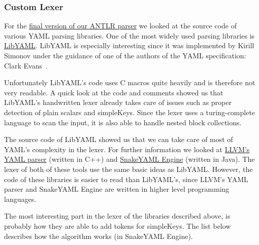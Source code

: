 \subsubsection{Custom Lexer}

For the \href{https://www.libelektra.org/plugins/yanlr}{final version of our ANTLR parser} we looked at the source code of various YAML parsing libraries. One of the most widely used parsing libraries is \href{https://github.com/yaml/libyaml}{LibYAML}. LibYAML is especially interesting since it was implemented by Kirill Simonov under the guidance of one of the authors of the YAML specification: Clark Evans~\cite{libyaml2018pyyaml}.

Unfortunately LibYAML’s code uses C macros quite heavily and is therefore not very readable. A quick look at the code and comments showed us that LibYAML’s handwritten lexer already takes care of issues such as proper detection of plain scalars and \glspl{simpleKey}. Since the lexer uses a turing-complete language to scan the input, it is also able to handle nested block \glspl{collection}.

The source code of LibYAML showed us that we can take care of most of YAML’s  complexity in the lexer. For further information we looked at \href{https://github.com/llvm/llvm-project/blob/master/llvm/lib/Support/YAMLParser.cpp}{LLVM’s YAML parser} (written in C++) and \href{https://bitbucket.org/asomov/snakeyaml-engine}{SnakeYAML Engine} (written in Java). The lexer of both of these tools use the same basic ideas as LibYAML. However, the code of these libraries is easier to read than LibYAML’s, since LLVM’s YAML parser and SnakeYAML Engine are written in higher level programming languages.

The most interesting part in the lexer of the libraries described above, is probably how they are able to add tokens for \glspl{simpleKey}. The list below describes how the algorithm works (in SnakeYAML Engine).

